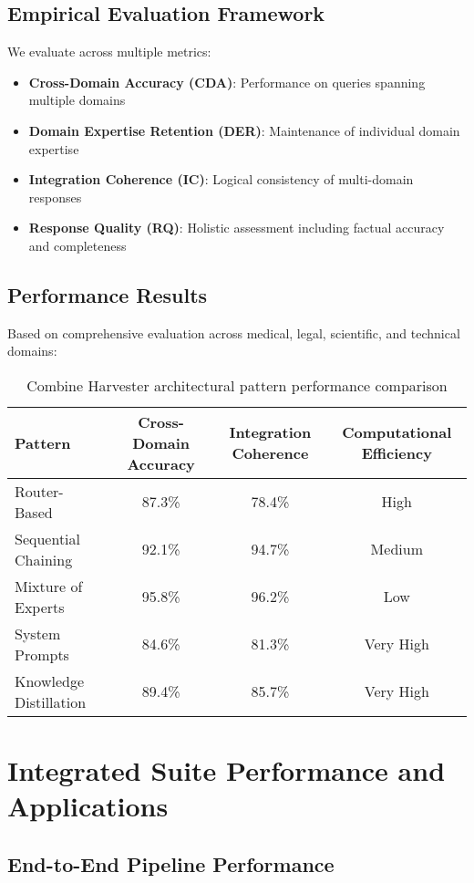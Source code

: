 \documentclass[12pt,a4paper]{article}
\begin{document}
\subsection{Empirical Evaluation Framework}

We evaluate across multiple metrics:

\begin{itemize}
\item \textbf{Cross-Domain Accuracy (CDA)}: Performance on queries spanning multiple domains
\item \textbf{Domain Expertise Retention (DER)}: Maintenance of individual domain expertise
\item \textbf{Integration Coherence (IC)}: Logical consistency of multi-domain responses
\item \textbf{Response Quality (RQ)}: Holistic assessment including factual accuracy and completeness
\end{itemize}

\subsection{Performance Results}

Based on comprehensive evaluation across medical, legal, scientific, and technical domains:

\begin{table}[h]
\centering
\begin{tabular}{lccc}
\toprule
Pattern & Cross-Domain Accuracy & Integration Coherence & Computational Efficiency \\
\midrule
Router-Based & 87.3\% & 78.4\% & High \\
Sequential Chaining & 92.1\% & 94.7\% & Medium \\
Mixture of Experts & 95.8\% & 96.2\% & Low \\
System Prompts & 84.6\% & 81.3\% & Very High \\
Knowledge Distillation & 89.4\% & 85.7\% & Very High \\
\bottomrule
\end{tabular}
\caption{Combine Harvester architectural pattern performance comparison}
\end{table}

\section{Integrated Suite Performance and Applications}

\subsection{End-to-End Pipeline Performance}
\end{document}
